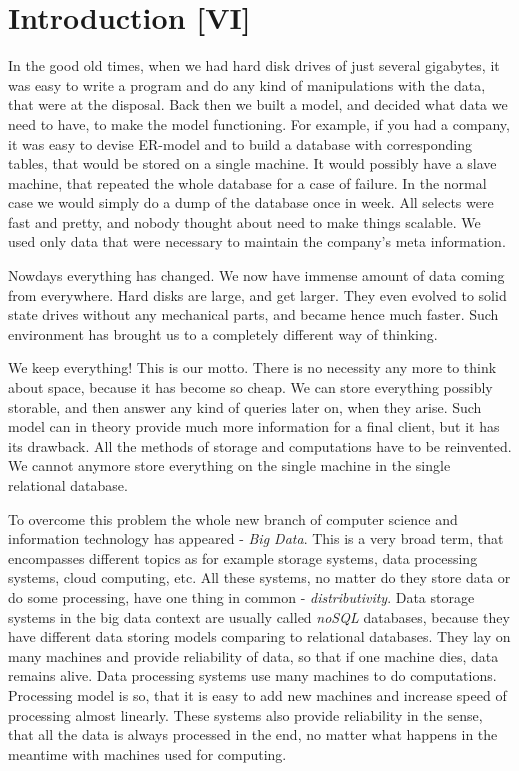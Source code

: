 \chapter{Introduction [VI]}
\label{chap:introduction}

In the good old times, when we had hard disk drives of just several gigabytes, it was easy to write a program and do any kind of manipulations with the data, that were at the disposal.
Back then we built a model, and decided what data we need to have, to make the model functioning.
For example, if you had a company, it was easy to devise ER-model and to build a database with corresponding tables, that would be stored on a single machine.
It would possibly have a slave machine, that repeated the whole database for a case of failure.
In the normal case we would simply do a dump of the database once in week.
All selects were fast and pretty, and nobody thought about need to make things scalable.
We used only data that were necessary to maintain the company's meta information.

Nowdays everything has changed.
We now have immense amount of data coming from everywhere.
Hard disks are large, and get larger.
They even evolved to solid state drives without any mechanical parts, and became hence much faster.
Such environment has brought us to a completely different way of thinking.

We keep everything!
This is our motto.
There is no necessity any more to think about space, because it has become so cheap.
We can store everything possibly storable, and then answer any kind of queries later on, when they arise.
Such model can in theory provide much more information for a final client, but it has its drawback.
All the methods of storage and computations have to be reinvented.
We cannot anymore store everything on the single machine in the single relational database.

To overcome this problem the whole new branch of computer science and information technology has appeared - \textit{Big Data}.
This is a very broad term, that encompasses different topics as for example storage systems, data processing systems, cloud computing, etc.
All these systems, no matter do they store data or do some processing, have one thing in common - \textit{distributivity}.
Data storage systems in the big data context are usually called \textit{noSQL} databases, because they have different data storing models comparing to relational databases.
They lay on many machines and provide reliability of data, so that if one machine dies, data remains alive.
Data processing systems use many machines to do computations.
Processing model is so, that it is easy to add new machines and increase speed of processing almost linearly.
These systems also provide reliability in the sense, that all the data is always processed in the end, no matter what happens in the meantime with machines used for computing.

